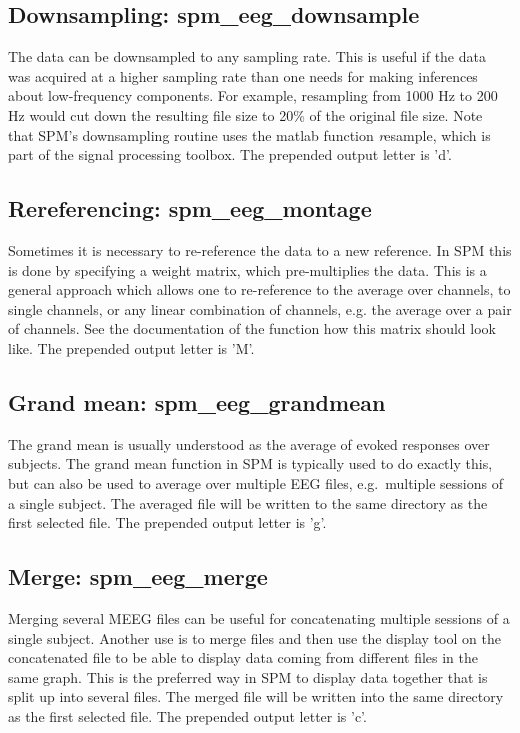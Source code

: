 \subsection{Downsampling: spm\_eeg\_downsample}
The data can be downsampled to any sampling rate. This is useful if
the data was acquired at a higher sampling rate than one needs for 
making inferences about low-frequency components. For example,
resampling from 1000 Hz to 200 Hz would cut down the resulting file
size to 20\% of the original file size. Note that SPM's downsampling
routine uses the matlab function {\textit resample}, which is part of
the signal processing toolbox. The prepended output letter is 'd'.


\subsection{Rereferencing: spm\_eeg\_montage}
Sometimes it is necessary to re-reference the data to a new
reference. In SPM this is done by specifying a weight matrix, which 
pre-multiplies the data. This is a general approach which 
allows one to re-reference to the average over channels, to single
channels, or any linear combination of channels, e.g. the average over
a pair of channels. See the documentation of the function how this
matrix should look like. The prepended output letter is 'M'.


\subsection{Grand mean: spm\_eeg\_grandmean}
The grand mean is usually understood as the average of evoked
responses over subjects. The grand mean function in SPM is typically
used to do exactly this, but can also be used to average over multiple 
EEG files, e.g.~multiple sessions of a single subject. The averaged
file will be written to the same directory as the first selected
file. The prepended output letter is 'g'.


\subsection{Merge: spm\_eeg\_merge}
Merging several MEEG files can be useful for concatenating multiple
sessions of a single subject. Another use is to merge files and then
use the display tool on the concatenated file to be able to display
data coming from different files in the same graph. This is the
preferred way in SPM to display data together that is split up into
several files. The merged file will be written into the same directory
as the first selected file. The prepended output letter is 'c'.


